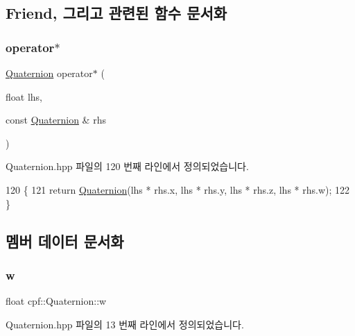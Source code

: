 \subsection{Friend, 그리고 관련된 함수 문서화}
\mbox{\label{classcpf_1_1_quaternion_ac4687317eafd9a3cfcfc56ed1af8299e}} 
\subsubsection{\texorpdfstring{operator$\ast$}{operator*}}
{\footnotesize\ttfamily \hyperlink{classcpf_1_1_quaternion}{Quaternion} operator$\ast$ (\begin{DoxyParamCaption}\item[{float}]{lhs,  }\item[{const \hyperlink{classcpf_1_1_quaternion}{Quaternion} \&}]{rhs }\end{DoxyParamCaption})\hspace{0.3cm}{\ttfamily [friend]}}



Quaternion.\+hpp 파일의 120 번째 라인에서 정의되었습니다.


\begin{DoxyCode}
120                                                                       \{
121             \textcolor{keywordflow}{return} \hyperlink{classcpf_1_1_quaternion_aae3cc98fcdb7a419a29db4ee988972bc}{Quaternion}(lhs * rhs.x, lhs * rhs.y, lhs * rhs.z, lhs * rhs.w);
122         \}
\end{DoxyCode}


\subsection{멤버 데이터 문서화}
\mbox{\label{classcpf_1_1_quaternion_af312a196b39bb4903b876bc454ac15f8}} 
\subsubsection{\texorpdfstring{w}{w}}
{\footnotesize\ttfamily float cpf\+::\+Quaternion\+::w}



Quaternion.\+hpp 파일의 13 번째 라인에서 정의되었습니다.

